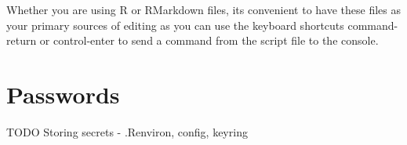 \documentclass[
]{book}
\begin{document}
Whether you are using R or RMarkdown files, its convenient to have these files as your primary sources of editing as you can use the keyboard shortcuts command-return or control-enter to send a command from the script file to the console.

\hypertarget{passwords}{%
\section{Passwords}\label{passwords}}

TODO Storing secrets - .Renviron, config, keyring

  
\end{document}
